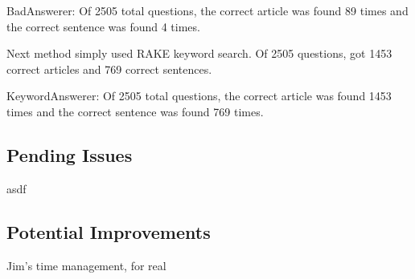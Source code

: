 \documentclass[11pt]{article}
\begin{document}
BadAnswerer: Of 2505 total questions, the correct article was found 89 times and the correct sentence was found 4 times.

Next method simply used RAKE keyword search. Of 2505 questions, got 1453 correct articles and 769 correct sentences.

KeywordAnswerer: Of 2505 total questions, the correct article was found 1453 times and the correct sentence was found 769 times.

\subsection{Pending Issues}

asdf

\subsection{Potential Improvements}

Jim's time management, for real

%
\end{document}
